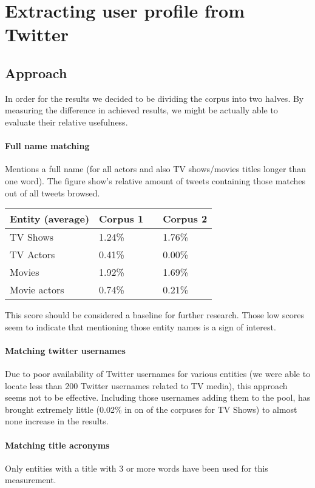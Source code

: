 \section{Extracting user profile from Twitter}
\subsection{Approach}
In order for the results we decided to be dividing the corpus into two halves.
By measuring the difference in achieved results, we might be actually able to
evaluate their relative usefulness.

\paragraph{Full name matching}
Mentions a full name (for all actors and also TV shows/movies titles longer
than one word). The figure show's relative amount of tweets containing those
matches out of all tweets browsed.

\begin{center}
  \begin{tabular}{ | p{4cm} | p{2cm} | p{1cm}| p{2cm} | } \hline
    Entity (average) & Corpus 1 & & Corpus 2 \\ \hline
    TV Shows & 1.24\% & & 1.76\% \\ \hline
    TV Actors & 0.41\% & & 0.00\% \\ \hline
    Movies & 1.92\% & & 1.69\% \\ \hline
    Movie actors & 0.74\% & & 0.21\% \\ \hline
  \end{tabular}
\end{center}

This score should be considered a baseline for further research. Those low scores seem to indicate
that mentioning those entity names is a sign of interest.

\paragraph{Matching twitter usernames}
Due to poor availability of Twitter usernames for various entities (we were able to locate less than 200 Twitter
usernames related to TV media), this approach seems not to be effective. Including those usernames adding them to the pool,
has brought extremely little (0.02\% in on of the corpuses for TV Shows) to almost none increase in the results.

\paragraph{Matching title acronyms}
Only entities with a title with 3 or more words have been used for this measurement.

